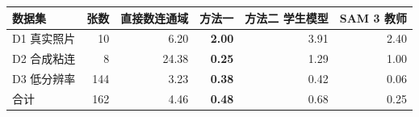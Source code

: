 \begin{tabular}{lrrrrr}
\toprule
数据集 & 张数 & 直接数连通域 & 方法一 & 方法二 学生模型 & SAM 3 教师 \\
\midrule
D1 真实照片 & 10 & 6.20 & \textbf{2.00} & 3.91 & 2.40 \\
D2 合成粘连 & 8 & 24.38 & \textbf{0.25} & 1.29 & 1.00 \\
D3 低分辨率 & 144 & 3.23 & \textbf{0.38} & 0.42 & 0.06 \\
\midrule
合计 & 162 & 4.46 & \textbf{0.48} & 0.68 & 0.25 \\
\bottomrule
\end{tabular}